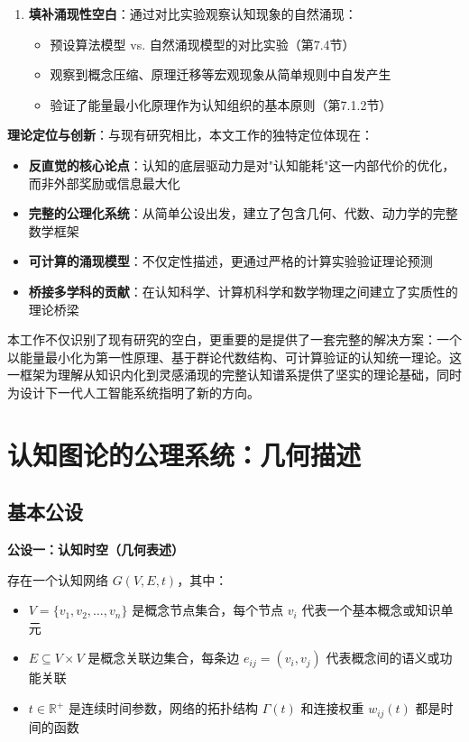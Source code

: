 \documentclass[12pt,a4paper]{article}
\begin{document}
\begin{enumerate}
\item \textbf{填补涌现性空白}：通过对比实验观察认知现象的自然涌现：
\begin{itemize}
\item 预设算法模型 vs. 自然涌现模型的对比实验（第7.4节）
\item 观察到概念压缩、原理迁移等宏观现象从简单规则中自发产生
\item 验证了能量最小化原理作为认知组织的基本原则（第7.1.2节）
\end{itemize}
\end{enumerate}

\textbf{理论定位与创新}：与现有研究相比，本文工作的独特定位体现在：

\begin{itemize}
\item \textbf{反直觉的核心论点}：认知的底层驱动力是对"认知能耗"这一内部代价的优化，而非外部奖励或信息最大化
\item \textbf{完整的公理化系统}：从简单公设出发，建立了包含几何、代数、动力学的完整数学框架
\item \textbf{可计算的涌现模型}：不仅定性描述，更通过严格的计算实验验证理论预测
\item \textbf{桥接多学科的贡献}：在认知科学、计算机科学和数学物理之间建立了实质性的理论桥梁
\end{itemize}

本工作不仅识别了现有研究的空白，更重要的是提供了一套完整的解决方案：一个以能量最小化为第一性原理、基于群论代数结构、可计算验证的认知统一理论。这一框架为理解从知识内化到灵感涌现的完整认知谱系提供了坚实的理论基础，同时为设计下一代人工智能系统指明了新的方向。

\section{认知图论的公理系统：几何描述}

\subsection{基本公设}

\textbf{公设一：认知时空（几何表述）}

存在一个认知网络 $G(V,E,t)$，其中：
\begin{itemize}
\item $V = \{v_1, v_2, \ldots, v_n\}$ 是概念节点集合，每个节点 $v_i$ 代表一个基本概念或知识单元
\item $E \subseteq V \times V$ 是概念关联边集合，每条边 $e_{ij} = (v_i, v_j)$ 代表概念间的语义或功能关联
\item $t \in \mathbb{R}^+$ 是连续时间参数，网络的拓扑结构 $\Gamma(t)$ 和连接权重 $w_{ij}(t)$ 都是时间的函数
\end{itemize}
\end{document}
